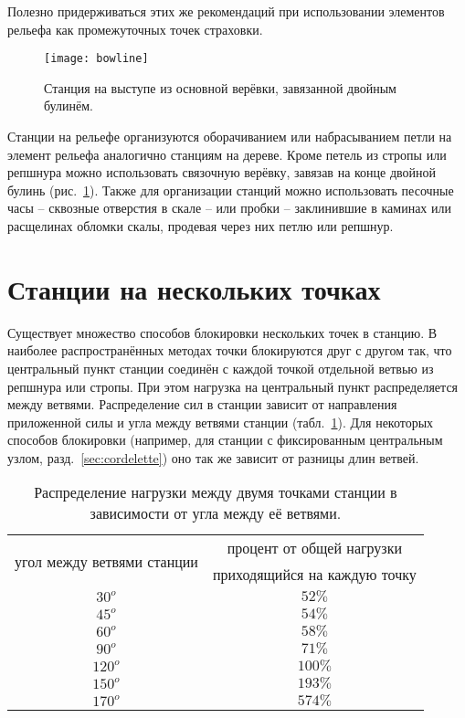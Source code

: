 \documentclass[fleqn, 12pt]{extarticle}
\begin{document}
    Полезно придерживаться этих же рекомендаций при использовании элементов рельефа как промежуточных точек страховки.
    \begin{figure}[h]
        \centering
        \texttt{[image: bowline]}
        \caption{Станция на выступе из основной верёвки, завязанной двойным булинём.}\label{fig:bowline}
    \end{figure}
    
    Станции на рельефе организуются оборачиванием или набрасыванием петли на элемент рельефа аналогично станциям на дереве. Кроме петель из стропы или репшнура можно использовать
    связочную верёвку, завязав на конце двойной булинь (рис.~\ref{fig:bowline}). Также для организации станций можно использовать песочные часы -- сквозные отверстия в скале --
    или пробки -- заклинившие в каминах или расщелинах обломки скалы, продевая через них петлю или репшнур.

\section{Станции на нескольких точках}\label{sec:multipoint.anchors}
    Существует множество способов блокировки нескольких точек в станцию. В наиболее распространённых методах точки блокируются друг с другом
    так, что центральный пункт станции соединён с каждой точкой отдельной ветвью из репшнура или стропы. При этом нагрузка на центральный пункт распределяется между ветвями.
    Распределение сил в станции зависит от направления приложенной силы и угла между ветвями станции
    (табл.~\ref{tab:angle}). Для некоторых способов блокировки (например, для станции с фиксированным центральным узлом, разд.~\ref{sec:cordelette}) оно так же зависит от разницы длин ветвей.
    \begin{table}[h]
        \centering
        \begin{tabular}{|c|c|}
            \hline
            \multirow{2}{*}{угол между ветвями станции} & процент от общей нагрузки \\ & приходящийся на каждую точку \\
            \hline
            $30^o$ & $52\%$ \\
            $45^o$ & $54\%$ \\
            $60^o$ & $58\%$ \\
            $90^o$ & $71\%$ \\
            $120^o$ & $100\%$ \\
            $150^o$ & $193\%$ \\
            $170^o$ & $574\%$ \\
            \hline
        \end{tabular}
        \caption{Распределение нагрузки между двумя точками станции в зависимости от угла между её ветвями.}\label{tab:angle}
    \end{table}
    
\end{document}
